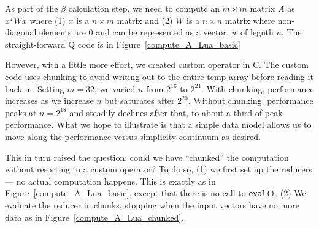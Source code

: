 As part of the \(\beta\) calculation step, we need to compute an \(m \times m\)
matrix \(A\) as  \(x^T W x\) where (1) 
\(x\) is a \(n \times m\) matrix and (2) \(W\) is a \(n \times n\) matrix where
non-diagonal elements are 0 and can be represented as a vector, \(w\) of legnth
\(n\). 
The straight-forward Q code is in Figure~\ref{compute_A_Lua_basic}
\begin{figure}
\centering
{}
\end{figure}

However, with a little more effort, we created custom operator in C.
The custom code uses
chunking to avoid writing out to the entire temp array before reading it
back in. Setting \(m=32\), we varied \(n\) from \(2^{16}\) to \(2^{24}\). With
chunking, performance increases as we increase \(n\) but saturates after
\(2^{20}\). Without chunking, performance peaks at \(n=2^{18}\) and steadily
declines after that, to about a third of peak performance.
What we hope to illustrate is that a
simple data model allows us to move along the performance versus simplicity
continuum as desired.


This in turn raised the question: could we have ``chunked'' the computation 
without resorting to a custom operator? To do so, (1)
we first set up the reducers --- no actual
computation happens. This is exactly as in Figure~\ref{compute_A_Lua_basic}, except that there is no call to
{\tt eval()}. (2) We evaluate the reducer in chunks, stopping
when the input vectors have no more data as in
Figure~\ref{compute_A_Lua_chunked}.
\begin{figure}
\centering
{}
\end{figure}

